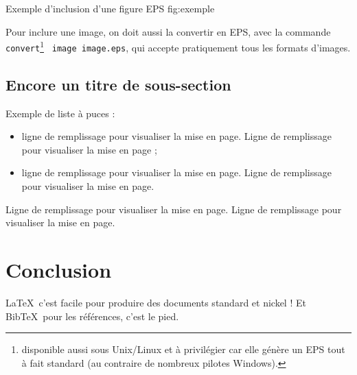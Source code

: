 \documentclass[a4paper,11pt]{article}
\begin{document}

                  {Exemple d'inclusion d'une figure EPS}   
                  {fig:exemple}

Pour inclure une image, on doit aussi la convertir en EPS, avec
la commande \texttt{convert}\footnote{
disponible aussi sous Unix/Linux et à privilégier 
car elle génère un EPS tout à fait standard 
(au contraire de nombreux pilotes Windows).}
\texttt{~image image.eps}, qui accepte pratiquement tous les formats d'images.


\subsection{Encore un titre de sous-section}

Exemple de liste à puces :
\begin{itemize}
        \item ligne de remplissage pour visualiser la mise en page. Ligne de
        remplissage pour visualiser la mise en page ;

        \item ligne de remplissage pour visualiser la mise en page. Ligne de
        remplissage pour visualiser la mise en page.
\end{itemize}

Ligne de remplissage pour visualiser la mise en page. Ligne de remplissage pour
visualiser la mise en page. 


\section{Conclusion} 
 
\LaTeX\ c'est facile pour produire des documents standard et nickel ! 
Et Bib\TeX\ pour les références, c'est le pied.


\end{document}
